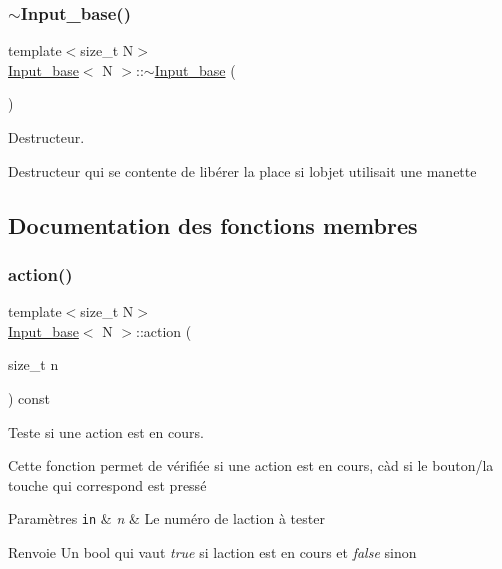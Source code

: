 \subsubsection{\texorpdfstring{$\sim$\+Input\+\_\+base()}{~Input\_base()}}
{\footnotesize\ttfamily template$<$size\+\_\+t N$>$ \\
\hyperlink{class_input__base}{Input\+\_\+base}$<$ N $>$\+::$\sim$\hyperlink{class_input__base}{Input\+\_\+base} (\begin{DoxyParamCaption}{ }\end{DoxyParamCaption})}



Destructeur. 

Destructeur qui se contente de libérer la place si l\textquotesingle{}objet utilisait une manette 

\subsection{Documentation des fonctions membres}
\mbox{\label{class_input__base_a2ac741377832fd670954dba5abf82a10}} 
\subsubsection{\texorpdfstring{action()}{action()}}
{\footnotesize\ttfamily template$<$size\+\_\+t N$>$ \\
\hyperlink{class_input__base}{Input\+\_\+base}$<$ N $>$\+::action (\begin{DoxyParamCaption}\item[{size\+\_\+t}]{n }\end{DoxyParamCaption}) const}



Teste si une action est en cours. 

Cette fonction permet de vérifiée si une action est en cours, càd si le bouton/la touche qui correspond est pressé 
\begin{DoxyParams}[1]{Paramètres}
\mbox{\tt in}  & {\em n} & Le numéro de l\textquotesingle{}action à tester \\
\hline
\end{DoxyParams}
\begin{DoxyReturn}{Renvoie}
Un {\ttfamily bool} qui vaut {\itshape true} si l\textquotesingle{}action est en cours et {\itshape false} sinon 
\end{DoxyReturn}
\mbox{\label{class_input__base_a61bba67b702dfd77db2091409ab1d20b}} 
